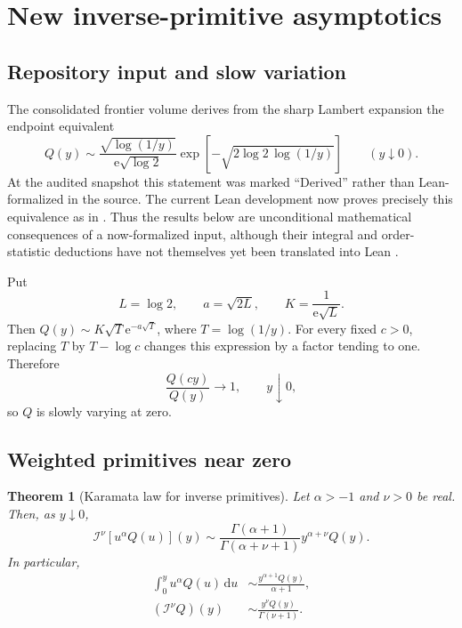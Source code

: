 \documentclass[11pt,oneside]{article}
\newtheorem{theorem}{Theorem}[section]
\theoremstyle{definition}
\theoremstyle{remark}
\newcommand{\dd}{\,\mathrm d}
\newcommand{\e}{\mathrm e}
\newcommand{\RL}{\mathcal I}
\newcommand{\1}{\mathbf 1}
\begin{document}
\section{New inverse-primitive asymptotics}
\label{p1:sec:inverse-asymptotics}

\subsection{Repository input and slow variation}
The consolidated frontier volume derives from the sharp Lambert expansion the
endpoint equivalent
\begin{equation}
 Q(y)\sim
 \frac{\sqrt{\log(1/y)}}{\e\sqrt{\log2}}
 \exp\!\left[-\sqrt{2\log2\,\log(1/y)}\right]
 \qquad(y\downarrow0).                                        \label{p1:eq:Q-asympt-input}
\end{equation}
At the audited snapshot this statement was marked ``Derived'' rather than
Lean-formalized in the source.  The current Lean development now proves
precisely this equivalence as
 in
.  Thus the results below are
unconditional mathematical consequences of a now-formalized input, although
their integral and order-statistic deductions have not themselves yet been
translated into Lean \cite{p1:ProveItFrontiers}.

Put
\begin{equation}
 L=\log2,\qquad a=\sqrt{2L},\qquad K=\frac1{\e\sqrt L}.          \label{p1:eq:Ka}
\end{equation}
Then \(Q(y)\sim K\sqrt T\e^{-a\sqrt T}\), where
\(T=\log(1/y)\).  For every fixed \(c>0\), replacing \(T\) by
\(T-\log c\) changes this expression by a factor tending to one.  Therefore
\begin{equation}
 \frac{Q(cy)}{Q(y)}\longrightarrow1,\qquad y\downarrow0,       \label{p1:eq:Q-slow}
\end{equation}
so \(Q\) is slowly varying at zero.

\subsection{Weighted primitives near zero}

\begin{theorem}[Karamata law for inverse primitives]\label{p1:thm:Q-Karamata}
Let \(\alpha>-1\) and \(\nu>0\) be real.  Then, as \(y\downarrow0\),
\begin{equation}
 \boxed{\quad
 \RL^\nu[u^\alpha Q(u)](y)
 \sim
 \frac{\Gamma(\alpha+1)}{\Gamma(\alpha+\nu+1)}
 y^{\alpha+\nu}Q(y).
 \quad}                                                        \label{p1:eq:Q-weighted-Karamata}
\end{equation}
In particular,
\begin{align}
 \int_0^yu^\alpha Q(u)\dd u
 &\sim\frac{y^{\alpha+1}Q(y)}{\alpha+1},                       \label{p1:eq:Q-first-Karamata}\\
 (\RL^\nu Q)(y)&\sim\frac{y^\nu Q(y)}{\Gamma(\nu+1)}.         \label{p1:eq:Q-fractional-Karamata}
\end{align}
\end{theorem}
\end{document}
